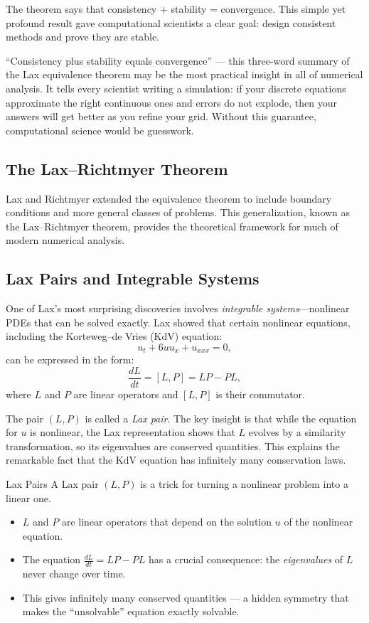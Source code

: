 The theorem says that consistency + stability = convergence. This simple yet profound result gave computational scientists a clear goal: design consistent methods and prove they are stable.

\begin{bigidea}
``Consistency plus stability equals convergence'' --- this three-word summary of the Lax equivalence theorem may be the most practical insight in all of numerical analysis. It tells every scientist writing a simulation: if your discrete equations approximate the right continuous ones and errors do not explode, then your answers will get better as you refine your grid. Without this guarantee, computational science would be guesswork.
\end{bigidea}

\subsection{The Lax--Richtmyer Theorem}

Lax and Richtmyer extended the equivalence theorem to include boundary conditions and more general classes of problems. This generalization, known as the Lax--Richtmyer theorem, provides the theoretical framework for much of modern numerical analysis.

\subsection{Lax Pairs and Integrable Systems}

One of Lax's most surprising discoveries involves \emph{integrable systems}---nonlinear PDEs that can be solved exactly. Lax showed that certain nonlinear equations, including the Korteweg--de Vries (KdV) equation:
\[
u_t + 6uu_x + u_{xxx} = 0,
\]
can be expressed in the form:
\[
\frac{dL}{dt} = [L, P] = LP - PL,
\]
where $L$ and $P$ are linear operators and $[L, P]$ is their commutator.

The pair $(L, P)$ is called a \emph{Lax pair}. The key insight is that while the equation for $u$ is nonlinear, the Lax representation shows that $L$ evolves by a similarity transformation, so its eigenvalues are conserved quantities. This explains the remarkable fact that the KdV equation has infinitely many conservation laws.

\begin{knowledgebridge}{Lax Pairs}
A Lax pair $(L, P)$ is a trick for turning a nonlinear problem into a linear one.
\begin{itemize}
    \item $L$ and $P$ are linear operators that depend on the solution $u$ of the nonlinear equation.
    \item The equation $\frac{dL}{dt} = LP - PL$ has a crucial consequence: the \emph{eigenvalues} of $L$ never change over time.
    \item This gives infinitely many conserved quantities --- a hidden symmetry that makes the ``unsolvable'' equation exactly solvable.
\end{itemize}
\end{knowledgebridge}

